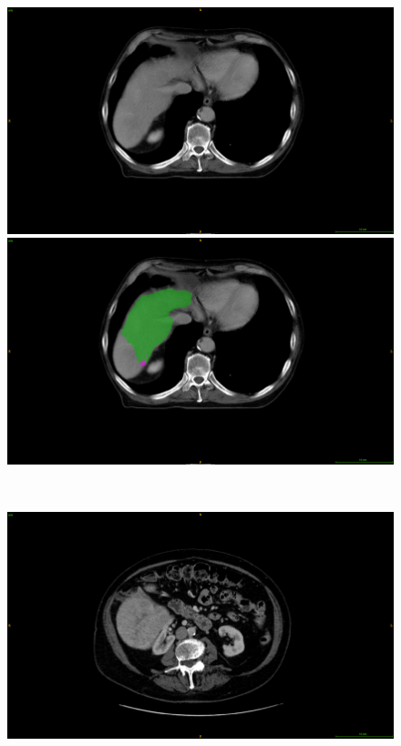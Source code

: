 \begin{figure}[ht!]
	\centering
	\begin{minipage}{0.45\linewidth}
		\includegraphics[width=\linewidth]{../Contributions/images/MisSegmentations/ResizeTCGA-DD-A3A1_slice80_raw}
	\end{minipage} \hspace{-0.1cm}
	\begin{minipage}{0.45\linewidth}
		\includegraphics[width=\linewidth]{../Contributions/images/MisSegmentations/ResizeTCGA-DD-A3A1_slice80_liverPrediction_Cmap}
	\end{minipage} \\
	\begin{minipage}{0.45\linewidth}
		\includegraphics[width=\linewidth]{../Contributions/images/MisSegmentations/ResizeTCGA-DD-A4NK_slice32_raw}

\end{minipage}
\end{figure}
